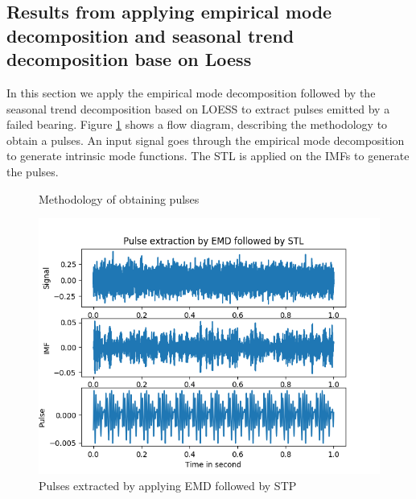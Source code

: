 \documentclass[../Main/thesis.tex]{subfiles}
\begin{document}
\subsection{Results from applying empirical mode decomposition and seasonal trend decomposition base on Loess}
In this section we apply the empirical mode decomposition followed by the seasonal trend decomposition based on LOESS to extract pulses emitted by a failed bearing.
Figure \ref{fig:pulse} shows a flow diagram, describing the methodology to obtain a pulses. An input signal goes through the empirical mode decomposition to generate intrinsic mode functions. 
The STL is applied on the IMFs to generate the pulses.
\begin{figure}[H]
  \caption{Methodology of obtaining pulses }
   \label{fig:pulse}
\end{figure}
\begin{figure}[H] %
   \centering
   \includegraphics[width=6in]{../fig/emd-stl.png} 
   \caption{Pulses extracted by applying EMD followed by STP}
   \label{fig:emd-stl}
\end{figure}

 







\blankpage
\end{document}
